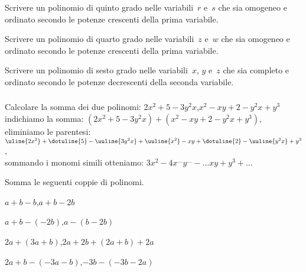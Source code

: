 \begin{htmulticols}{2}
\begin{esercizio}
\label{ese:10.8}
Scrivere un polinomio di quinto grado nelle variabili~\(r\) e~\(s\) che sia 
omogeneo e ordinato secondo le potenze crescenti della prima variabile.
\end{esercizio}

\begin{esercizio}
\label{ese:10.9}
Scrivere un polinomio di quarto grado nelle variabili~\(z\) e~\(w\) che sia 
omogeneo e ordinato secondo le potenze crescenti della prima variabile.
\end{esercizio}

\begin{esercizio}
\label{ese:10.10}
Scrivere un polinomio di sesto grado nelle variabili~\(x\), \(y\) e~\(z\) 
che sia completo e ordinato secondo le potenze decrescenti della seconda 
variabile.
\end{esercizio}

\end{htmulticols}

\subsubsection*{}

\begin{esercizio}
\label{ese:10.12}
Calcolare la somma dei due polinomi:\quad 
\(2x^2+5-3y^2x\),\quad \(x^2-xy+2-y^2x+y^3\)\\
indichiamo la somma: \quad 
\((2x^2+5-3y^2x)+(x^2-xy+2-y^2x+y^3)\), \\
eliminiamo le parentesi: \quad
\(\uline{2x^2}+\dotuline{5}-\uuline{3y^2x}+\uuline{x^2}-xy+\dotuline{2}-
\uuline{y^2x}+y^3\), \\
sommando i monomi simili otteniamo: \quad 
\(3x^2-4x^{\ldots}y^{\ldots}-\ldots xy+y^3+\ldots\)
\end{esercizio}


\begin{esercizio}
\label{ese:10.13}
Somma le seguenti coppie di polinomi.
\begin{htmulticols}{2}
\begin{enumeratea}
\spazielenx
\item \(a+b-b\),\quad \(a+b-2b\)
\item \(a+b-(-2b)\),\quad \(a-(b-2b)\)
\item \(2a+(3a+b)\),\quad \(2a+2b+(2a+b)+2a\)
\item \(2a+b-(-3a-b)\),\quad \(-3b-(-3b-2a)\)
\end{enumeratea}
\end{htmulticols}
\end{esercizio}

